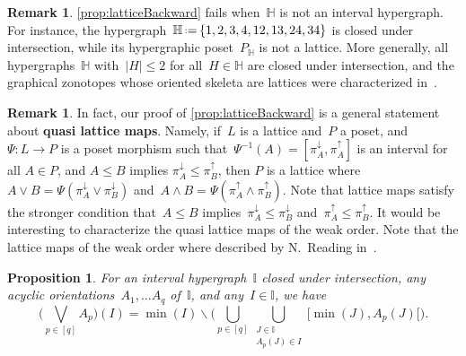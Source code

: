 \documentclass[reqno]{amsart}
\newtheorem{proposition}[theorem]{Proposition}
\theoremstyle{definition}
\newtheorem{remark}[theorem]{Remark}
\newcommand{\ssm}{\smallsetminus} %
\newcommand{\eqdef}{\mbox{\,\raisebox{0.2ex}{\scriptsize\ensuremath{\mathrm:}}\ensuremath{=}\,}} %
\newcommand{\defn}[1]{\textbf{\textsf{\color{PineGreen} #1}}} %
\newcommand{\meet}{\wedge} %
\newcommand{\join}{\vee} %
\newcommand{\bigJoin}{\bigvee} %
\newcommand{\projDown}{\pi^\downarrow} %
\newcommand{\projUp}{\pi^\uparrow} %
\newcommand{\HH}{\mathbb H}  %
\newcommand{\II}{\mathbb I} %
\begin{document}
\begin{remark}
\cref{prop:latticeBackward} fails when~$\HH$ is not an interval hypergraph.
For instance, the hypergraph~$\HH \eqdef \{ 1, 2, 3, 4, 12, 13, 24, 34 \}$ is closed under intersection, while its hypergraphic poset~$P_\HH$ is not a lattice.
More generally, all hypergraphs~$\HH$ with~$|H| \le 2$ for all~$H \in \HH$ are closed under intersection, and the graphical zonotopes whose oriented skeleta are lattices were characterized in~\cite{Pilaud-acyclicReorientationLattices}.
\end{remark}

\begin{remark}
In fact, our proof of \cref{prop:latticeBackward} is a general statement about \defn{quasi lattice maps}.
Namely, if~$L$ is a lattice and~$P$ a poset, and $\Psi : L \to P$ is a poset morphism such that~$\Psi^{-1}(A) = [\projDown_A, \projUp_A]$ is an interval  for all $A\in P$, and $A \le B$ implies $\projDown_A \le \projUp_B$, then $P$ is a lattice where~$A \join B =\Psi(\projDown_A \join \projDown_B)$ and~$A \meet B =\Psi(\projUp_A \meet \projUp_B)$.
Note that lattice maps satisfy the stronger condition that~$A \le B$ implies~$\projDown_A \le \projDown_B$ and~$\projUp_A \le \projUp_B$.
It would be interesting to characterize the quasi lattice maps of the weak order.
Note that the lattice maps of the weak order where described by N.~Reading in~\cite{Reading-latticeCongruences, Reading-arcDiagrams}.
\end{remark}

\begin{proposition}
\label{prop:joinLattice}
For an interval hypergraph~$\II$ closed under intersection, any acyclic orientations~$A_1, \dots A_q$ of~$\II$, and any~${I \in \II}$, we have
\[
\Big( \bigJoin_{p \in [q]} A_p \Big)(I) = \min(I) \ssm \Big( \bigcup_{p \in [q]} \bigcup_{\substack{J \in \II \\ A_p(J) \in I}} {[\min(J), A_p(J)[} \Big).
\]
\end{proposition}
\end{document}
